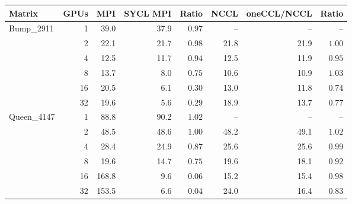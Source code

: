 \begin{tabular}{lrrrrrrr}
\toprule
Matrix & GPUs & MPI & SYCL MPI & Ratio & NCCL & oneCCL/NCCL & Ratio\\
\midrule
Bump\_2911 & 1 & 39.0 & 37.9 & $0.97$ & -- & -- & --\\
 & 2 & 22.1 & 21.7 & $0.98$ & 21.8 & 21.9 & $1.00$\\
 & 4 & 12.5 & 11.7 & $0.94$ & 12.5 & 11.9 & $0.95$\\
 & 8 & 13.7 & 8.0 & $0.75$ & 10.6 & 10.9 & $1.03$\\
 & 16 & 20.5 & 6.1 & $0.30$ & 13.0 & 11.8 & $0.74$\\
 & 32 & 19.6 & 5.6 & $0.29$ & 18.9 & 13.7 & $0.77$\\
\midrule
Queen\_4147 & 1 & 88.8 & 90.2 & $1.02$ & -- & -- & --\\
 & 2 & 48.5 & 48.6 & $1.00$ & 48.2 & 49.1 & $1.02$\\
 & 4 & 28.4 & 24.9 & $0.87$ & 25.6 & 25.6 & $0.99$\\
 & 8 & 19.6 & 14.7 & $0.75$ & 19.6 & 18.1 & $0.92$\\
 & 16 & 168.8 & 9.6 & $0.06$ & 15.2 & 15.4 & $0.98$\\
 & 32 & 153.5 & 6.6 & $0.04$ & 24.0 & 16.4 & $0.83$\\
\bottomrule
\end{tabular}
